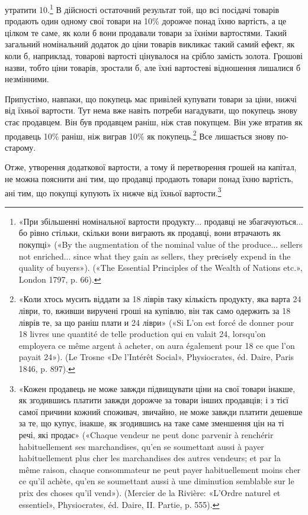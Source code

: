 утратити 10.\footnote{
«При збільшенні номінальної вартости продукту... продавці не
збагачуються... бо рівно стільки, скільки вони виграють як продавці,
вони втрачають як покупці» («By the augmentation of the nominal value
of the produce... sellers not enriched... since what they gain as sellers, they
prеcisеly expend in the quality of buyers»). («The Essential Principles of
the Wealth of Nations etc.», London 1797, p. 66).
} В дійсності остаточний результат той, що всі посідачі
товарів продають один одному свої товари на 10\% дорожче
понад їхню вартість, а це цілком те саме, як коли б вони продавали
товари за їхніми вартостями. Такий загальний номінальний
додаток до ціни товарів викликає такий самий ефект, як коли б,
наприклад, товарові вартості цінувалося на срібло замість золота.
Грошові назви, тобто ціни товарів, зростали б, але їхні
вартостеві відношення лишалися б незмінними.

Припустімо, навпаки, що покупець має привілей купувати
товари за ціни, нижчі від їхньої вартости. Тут нема вже навіть
потреби нагадувати, що покупець знову стає продавцем. Він
був продавцем раніш, ніж став покупцем. Він уже втратив як
продавець 10\% раніш, ніж виграв 10\% як покупець.\footnote{
«Коли хтось мусить віддати за 18 ліврів таку кількість продукту,
яка варта 24 ліври, то, вживши виручені гроші на купівлю, він так само
одержить за 18 ліврів те, за що раніш плати и 24 ліври» («Si L’on est
forcé de donner pour 18 livres une quantité de telle production qui en valait
24, lorsqu’on employera ce même argent à acheter, on aura également pour
18 ce que l’on payait 24»). (Le Trosne «De l’Intérêt Social»,
Physiocrates, éd. Daire, Paris 1846, p. 897).
}  Все лишається
знову по-старому.

Отже, утворення додаткової вартости, а тому й перетворення
грошей на капітал, не можна пояснити ані тим, що продавці
продають товари понад їхню вартість, ані тим, що покупці купують
їх нижче від їхньої вартости.\footnote{
«Кожен продавець не може завжди підвищувати ціни на свої товари
інакше, як згодившись платити завжди дорожче за товари інших продавців;
і з тієї самої причини кожний споживач, звичайно, не може завжди
платити дешевше за те, що купує, інакше, як згодившись на таке саме зменшення
цін на ті речі, які продає» («Chaque vendeur ne peut donc parvenir
à renchérir habituellement ses marchandises, qu’en se soumettant aussi à
payer habituellement plus cher les marchandises des autres vendeurs; et
par la même raison, chaque consommateur ne peut payer habituellement
moins cher ce qu’il achète, qu’en se soumettant aussi à une diminution
semblable sur le prix des choses qu’il vend»). (Mercier de la Rivière:
«L’Ordre naturel et essentiel», Physiocrates, éd. Daire, II. Partie, p. 555).
}

